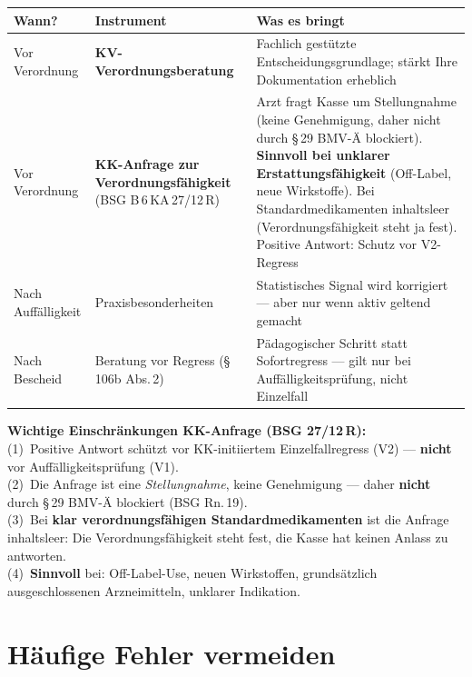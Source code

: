 \documentclass[a4paper]{umbruch-position}
\begin{document}
\begin{center}
{\small
\begin{tabular}{p{2.5cm} p{3cm} p{5.5cm}}
\toprule
\textbf{Wann?} & \textbf{Instrument} & \textbf{Was es bringt} \\
\midrule
Vor Verordnung & \textbf{KV-Verordnungs\-beratung} & Fachlich gest\"utzte Ent\-scheidungs\-grundlage; st\"arkt Ihre Dokumentation erheblich \\[4pt]
Vor Verordnung & \textbf{KK-Anfrage zur Verordnungs\-f\"ahigkeit} (BSG B\,6\,KA\,27/12\,R) & Arzt fragt Kasse um Stellungnahme (keine Genehmigung, daher nicht durch \S\,29 BMV-\"A blockiert). \textbf{Sinnvoll bei unklarer Erstattungsf\"ahigkeit} (Off-Label, neue Wirkstoffe). Bei Standardmedikamenten inhaltsleer (Verordnungsf\"ahigkeit steht ja fest). Positive Antwort: Schutz vor V2-Regress \\[4pt]
Nach Auff\"alligkeit & Praxisbesonder\-heiten & Statistisches Signal wird korrigiert --- aber nur wenn aktiv geltend gemacht \\[4pt]
Nach Bescheid & Beratung vor Regress (\S\,106b Abs.\,2) & P\"adagogischer Schritt statt Sofort\-regress --- gilt nur bei Auff\"alligkeitspr\"ufung, nicht Einzelfall \\
\bottomrule
\end{tabular}
}
\end{center}

\begin{infobox}
\textbf{Wichtige Einschr\"ankungen KK-Anfrage (BSG 27/12\,R):}\\
(1)~Positive Antwort sch\"utzt vor KK-initiiertem Einzelfallregress (V2) --- \textbf{nicht} vor Auff\"alligkeitspr\"ufung (V1).\\
(2)~Die Anfrage ist eine \textit{Stellungnahme}, keine Genehmigung --- daher \textbf{nicht} durch \S\,29 BMV-\"A blockiert (BSG Rn.\,19).\\
(3)~Bei \textbf{klar verordnungsf\"ahigen Standardmedikamenten} ist die Anfrage inhaltsleer: Die Verordnungsf\"ahigkeit steht fest, die Kasse hat keinen Anlass zu antworten.\\
(4)~\textbf{Sinnvoll} bei: Off-Label-Use, neuen Wirkstoffen, grundsätzlich ausgeschlossenen Arzneimitteln, unklarer Indikation.
\end{infobox}

\section{H\"aufige Fehler vermeiden}
\end{document}
